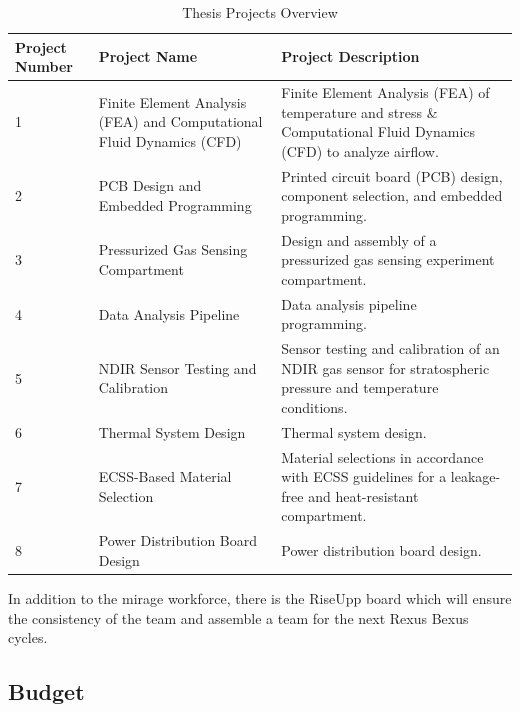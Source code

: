\begin{table}[htbp]
\centering
\caption{Thesis Projects Overview}
\label{tab:thesis}
\begin{tabular}{|l|L{3.5cm}|L{5.5cm}|}
\hline
\textbf{Project Number} & \textbf{Project Name} & \textbf{Project Description} \\ \hline

1 & Finite Element Analysis (FEA) and Computational Fluid Dynamics (CFD) 
& Finite Element Analysis (FEA) of temperature and stress \& Computational Fluid Dynamics (CFD) to analyze airflow. 
\\ \hline

2 & PCB Design and Embedded Programming 
& Printed circuit board (PCB) design, component selection, and embedded programming. 
\\ \hline

3 & Pressurized Gas Sensing Compartment 
& Design and assembly of a pressurized gas sensing experiment compartment. 
 \\ \hline

4 & Data Analysis Pipeline 
& Data analysis pipeline programming. 
 \\ \hline

5 & NDIR Sensor Testing and Calibration 
& Sensor testing and calibration of an NDIR gas sensor for stratospheric pressure and temperature conditions. 
 \\ \hline

6 & Thermal System Design 
& Thermal system design. 
 \\ \hline

7 & ECSS-Based Material Selection 
& Material selections in accordance with ECSS guidelines for a leakage-free and heat-resistant compartment. 
 \\ \hline

8 & Power Distribution Board Design 
& Power distribution board design. 
\\ \hline

\end{tabular}
\end{table}

In addition to the \gls{mirage} workforce, there is the RiseUpp board which will ensure the consistency of the team and assemble a team for the next Rexus Bexus cycles.
\clearpage

\subsection{Budget}

